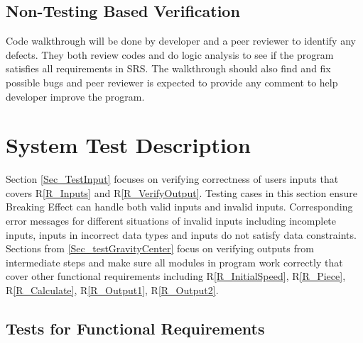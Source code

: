 \documentclass[12pt, titlepage]{article}
\newcommand{\rref}[1]{R\ref{#1}}
\begin{document}

\subsection{Non-Testing Based Verification}
Code walkthrough will be done by developer and a peer reviewer to identify any
defects. They both review codes and do logic analysis to see if the program
satisfies all requirements in SRS. The walkthrough should also find and fix
possible bugs and peer reviewer is expected to provide any comment to help
developer improve the program.


\section{System Test Description}

Section \ref{Sec_TestInput} focuses on verifying correctness of users inputs that covers \rref{R_Inputs} and \rref{R_VerifyOutput}. Testing cases in this section ensure Breaking Effect can handle both valid inputs and invalid inputs. Corresponding error messages for different situations of invalid inputs including incomplete inputs, inputs in incorrect data types and inputs do not satisfy data constraints.\\  
Sections from \ref{Sec_testGravityCenter} focus on verifying outputs from intermediate steps and make sure all modules in program work correctly that cover other functional requirements including \rref{R_InitialSpeed}, \rref{R_Piece}, \rref{R_Calculate}, \rref{R_Output1}, \rref{R_Output2}. 


\subsection{Tests for Functional Requirements}
\end{document}
